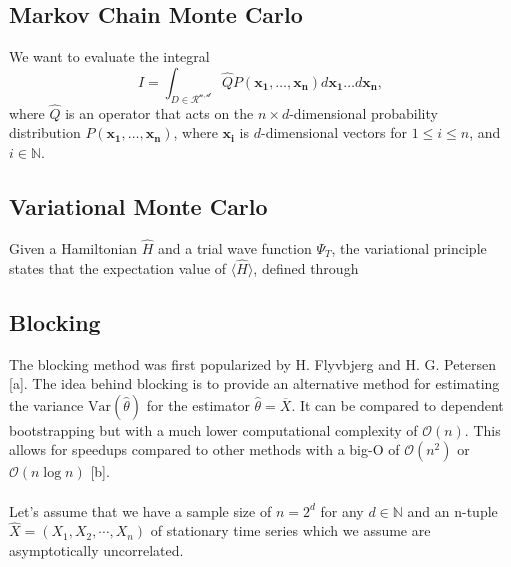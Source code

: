 \subsection*{Markov Chain Monte Carlo}
We want to evaluate the integral 
\begin{equation}
    I = \int_{D\in\mathcal{R^{n, d}}}\hat{Q}P(\mathbf{x_1}, \dots, \mathbf{x_n})d\mathbf{x_1}\dots d\mathbf{x_n},
\end{equation}
where $\hat{Q}$ is an operator that acts on the $n\times d$-dimensional probability distribution $P(\mathbf{x_1}, \dots, \mathbf{x_n})$, where $\mathbf{x_i}$ is $d$-dimensional vectors for $1\leq i\leq n$, and $i\in\mathbb{N}$. 

\subsection*{Variational Monte Carlo}
Given a Hamiltonian $\hat{H}$ and a trial wave function $\Psi_T$, the variational principle states that the expectation value of $\langle \hat{H} \rangle$, defined through

\subsection*{Blocking}

The blocking method was first popularized by H. Flyvbjerg and H. G. Petersen [a]. The idea behind blocking is to provide an alternative method for estimating the variance $\text{Var}(\hat{\theta})$ for the estimator $\hat{\theta} = \overline{X}$. It can be compared to dependent bootstrapping but with a much lower computational complexity of $\mathcal{O}(n)$. This allows for speedups compared to other methods with a big-O of $\mathcal{O}(n^2)$ or $\mathcal{O}(n \log n)$ [b]. \\\\
Let's assume that we have a sample size of $n = 2^d$ for any $d \in \mathbb{N}$ and an n-tuple $\hat{X} = (X_1, X_2, \cdots, X_n)$ of stationary time series which we assume are asymptotically uncorrelated. 



